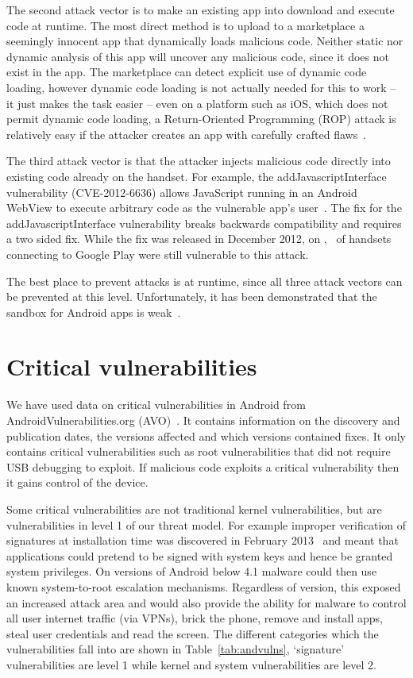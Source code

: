 \documentclass{sig-alternate}
\let\OldTodo\todo
\renewcommand{\todo}{\OldTodo[inline]}
\newcommand{\avo}{AVO}
\begin{document}
The second attack vector is to make an existing app into download and execute code at runtime.
The most direct method is to upload to a marketplace a seemingly innocent app that dynamically loads malicious code.
Neither static nor dynamic analysis of this app will uncover any malicious code, since it does not exist in the app.
The marketplace can detect explicit use of dynamic code loading, however dynamic code loading is not actually needed for this to work -- it just makes the task easier -- even on a platform such as iOS, which does not permit dynamic code loading, a Return-Oriented Programming (ROP) attack is relatively easy if the attacker creates an app with carefully crafted flaws~\cite{Wang2013a}.

The third attack vector is that the attacker injects malicious code directly into existing code already on the handset. 
For example, the addJavascriptInterface vulnerability (CVE-2012-6636) allows JavaScript running in an Android WebView to execute arbitrary code as the vulnerable app's user~\cite{Thomas2015a}.
The fix for the addJavascriptInterface vulnerability breaks backwards compatibility and requires a two sided fix.
While the fix was released in December 2012, on \daGPAPISeventeenLaterDate, \daGPAPISeventeenEarlierProportion\ of handsets connecting to Google Play were still vulnerable to this attack.

The best place to prevent attacks is at runtime, since all three attack vectors can be prevented at this level. 
Unfortunately, it has been demonstrated that the sandbox for Android apps is weak~\cite{androidvulnerabilities.org}.


\section{Critical vulnerabilities}
We have used data on critical vulnerabilities in Android from AndroidVulnerabilities.org (\avo)~\cite{androidvulnerabilities.org}.
It contains information on the discovery and publication dates, the versions affected and which versions contained fixes.
It only contains critical vulnerabilities such as root vulnerabilities that did not require USB debugging to exploit.
If malicious code exploits a critical vulnerability then it gains control of the device.

Some critical vulnerabilities are not traditional kernel vulnerabilities, but are vulnerabilities in level 1 of our threat model.
For example improper verification of signatures at installation time was discovered in February 2013~\cite{Forristal2013} and meant that applications could pretend to be signed with system keys and hence be granted system privileges.
On versions of Android below 4.1 malware could then use known system-to-root escalation mechanisms.
Regardless of version, this exposed an increased attack area and would also provide the ability for malware to control all user internet traffic (via VPNs), brick the phone, remove and install apps, steal user credentials and read the screen.
The different categories which the vulnerabilities fall into are shown in Table~\ref{tab:andvulns}, `signature' vulnerabilities are level 1 while kernel and system vulnerabilities are level 2.\todo{What is going on with these levels?}
\avoTabAndVulns
\end{document}
